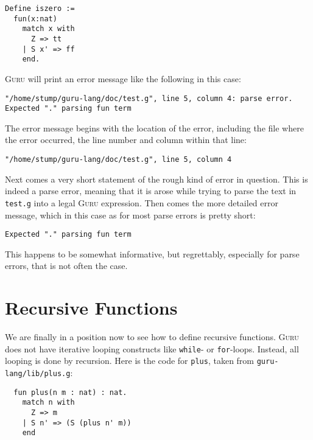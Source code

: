 \documentclass{book}[12pt]
\newcommand{\guru}[0]{\textsc{Guru}\xspace}
\begin{document}
\begin{verbatim}
Define iszero := 
  fun(x:nat) 
    match x with 
      Z => tt 
    | S x' => ff
    end.
\end{verbatim}

\noindent \guru will print an error message like the following
in this case:

\begin{verbatim}
"/home/stump/guru-lang/doc/test.g", line 5, column 4: parse error.
Expected "." parsing fun term
\end{verbatim}

The error message begins with the location of the error, including the
file where the error occurred, the line number and column within that
line:

\begin{verbatim}
"/home/stump/guru-lang/doc/test.g", line 5, column 4
\end{verbatim}

 \noindent Next comes a very short statement of the rough kind of
error in question.  This is indeed a parse error, meaning that it is
arose while trying to parse the text in \texttt{test.g} into a legal
\guru expression.  Then comes the more detailed error message, which
in this case as for most parse errors is pretty short:

\begin{verbatim}
Expected "." parsing fun term
\end{verbatim}

 \noindent This happens to be somewhat informative, but regrettably,
especially for parse errors, that is not often the case.

\section{Recursive Functions}
\label{ch2:rec}

We are finally in a position now to see how to define recursive
functions.  \guru does not have iterative looping constructs like
\texttt{while}- or \texttt{for}-loops.  Instead, all looping is done
by recursion.  Here is the code for \texttt{plus}, taken from
\texttt{guru-lang/lib/plus.g}:

\begin{verbatim}
  fun plus(n m : nat) : nat.
    match n with
      Z => m
    | S n' => (S (plus n' m))
    end
\end{verbatim}
\end{document}

